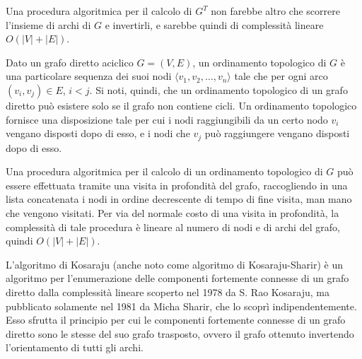 Una procedura algoritmica per il calcolo di $G^T$ non farebbe altro che scorrere l'insieme di archi di $G$ e
invertirli, e sarebbe quindi di complessit\`a lineare $O(|V|+|E|)$.


Dato un grafo diretto aciclico $G = (V, E)$, un ordinamento topologico di $G$ \`e una particolare sequenza
dei suoi nodi $\langle v_1, v_2, \ldots, v_n \rangle$ tale che per ogni arco $(v_i, v_j) \in E$, $i < j$.
Si noti, quindi, che un ordinamento topologico di un grafo diretto pu\`o esistere solo se il grafo non contiene
cicli.
Un ordinamento topologico fornisce una disposizione tale per cui i nodi raggiungibili da un certo nodo $v_i$ vengano
disposti dopo di esso, e i nodi che $v_j$ pu\`o raggiungere vengano disposti dopo di esso.

Una procedura algoritmica per il calcolo di un ordinamento topologico di $G$ pu\`o essere effettuata tramite una
visita in profondit\`a del grafo, raccogliendo in una lista concatenata i nodi in ordine decrescente di tempo
di fine visita, man mano che vengono visitati.
Per via del normale costo di una visita in profondit\`a, la complessit\`a di tale procedura \`e lineare al
numero di nodi e di archi del grafo, quindi $O(|V|+|E|)$.


L'algoritmo di Kosaraju (anche noto come algoritmo di Kosaraju-Sharir) è un algoritmo per l'enumerazione
delle componenti fortemente connesse di un grafo diretto dalla complessità lineare scoperto nel 1978 da S. Rao
Kosaraju, ma pubblicato solamente nel 1981 da Micha Sharir, che lo scoprì indipendentemente.
Esso sfrutta il principio per cui le componenti fortemente connesse di un grafo diretto sono le stesse del suo grafo
trasposto, ovvero il grafo ottenuto invertendo l'orientamento di tutti gli archi. \newline




